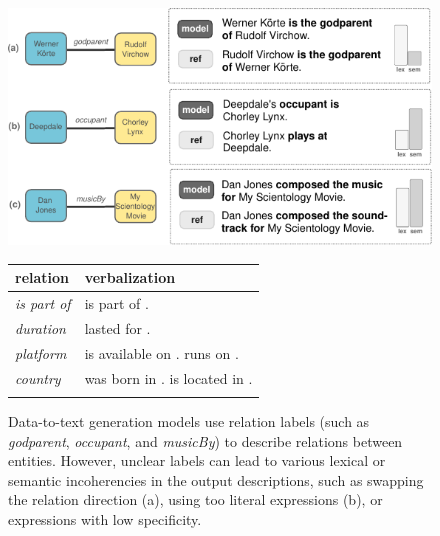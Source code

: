\begin{figure}[t]
    \begin{minipage}{0.55\textwidth}
        \centering
        \includegraphics[width=\textwidth]{img/mind_the_labels.pdf}
        \caption{Data-to-text generation models use relation labels (such as  \mbox{\textit{godparent}}, \mbox{\textit{occupant}}, and \mbox{\textit{musicBy}}) to describe relations between entities. However, unclear labels can lead to various lexical or semantic incoherencies in the output descriptions, such as swapping the relation direction (a), using too literal expressions (b), or expressions with low specificity.}
        \label{fig:rel2text:teaser}
    \end{minipage}
    \hfill
    \begin{minipage}{0.4\textwidth}
        \centering
        \footnotesize
        \begin{tabular}{lp{3.3cm}} \toprule
            \textbf{relation}   & \textbf{verbalization}                                               \\ \midrule
            \textit{is part of} & \eh{} is part of \et{}.                                              \\\hdashline[0.5pt/2pt]
            \textit{duration}   & \eh{} lasted for \et{}.                                              \\\hdashline[0.5pt/2pt]
            \textit{platform}   & \eh{} is available on \et{}.\newline\eh{} runs on \et{}.             \\\hdashline[0.5pt/2pt]
            \textit{country}    & \eh{} was born in \et{}. \newline \eh{} is located in \et{}.         \\\hdashline[0.5pt/2pt]

\end{tabular}
\end{minipage}
\end{figure}
